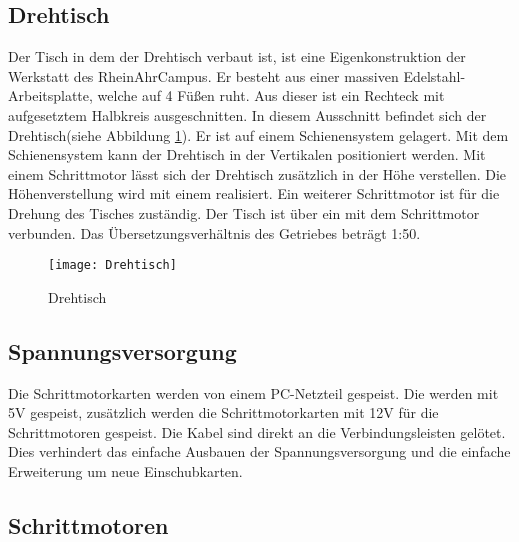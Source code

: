 \subsection{Drehtisch}
\label{sec:Drehtisch}
Der Tisch in dem der Drehtisch verbaut ist, ist eine Eigenkonstruktion der Werkstatt des RheinAhrCampus. Er besteht aus einer massiven Edelstahl-Arbeitsplatte, welche auf 4 Füßen ruht. Aus dieser ist ein Rechteck mit aufgesetztem Halbkreis ausgeschnitten. In diesem Ausschnitt befindet sich der Drehtisch(siehe Abbildung \ref{fig:Drehtisch}). Er ist auf einem Schienensystem gelagert. Mit dem Schienensystem kann der Drehtisch in der Vertikalen positioniert werden. Mit einem Schrittmotor lässt sich der Drehtisch zusätzlich in der Höhe verstellen. Die Höhenverstellung wird mit einem  realisiert. Ein weiterer Schrittmotor ist für die Drehung des Tisches zuständig. Der Tisch ist über ein  mit dem Schrittmotor verbunden. Das Übersetzungsverhältnis des Getriebes beträgt 1:50.  
\begin{figure}[h]
\centering
\texttt{[image: Drehtisch]}
\caption{Drehtisch}
\label{fig:Drehtisch}
\end{figure}
 
\subsection{Spannungsversorgung}
\label{sec:Spannungsv}
Die Schrittmotorkarten werden von einem PC-Netzteil gespeist. Die  werden mit 5V gespeist, zusätzlich werden die Schrittmotorkarten mit 12V für die Schrittmotoren gespeist. Die Kabel sind direkt an die Verbindungsleisten gelötet.\\
Dies verhindert das einfache Ausbauen der Spannungsversorgung und die einfache Erweiterung um neue Einschubkarten.
\subsection{Schrittmotoren}
\label{sec:Schrittmotoren}
\\

